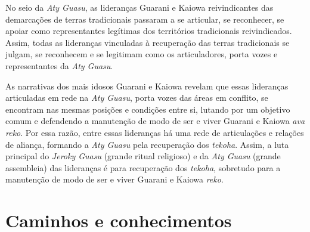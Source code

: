 No seio da \emph{Aty Guasu}, as lideranças Guarani e Kaiowa reivindicantes das
demarcações de terras tradicionais passaram a se articular, se
reconhecer, se apoiar como representantes legítimas dos territórios
tradicionais reivindicados. Assim, todas as lideranças vinculadas à
recuperação das terras tradicionais se julgam, se reconhecem e se
legitimam como os articuladores, porta vozes e representantes da \emph{Aty
Guasu}. 

As narrativas dos mais idosos Guarani e Kaiowa revelam que essas
lideranças articuladas em rede na \emph{Aty Guasu}, porta vozes das áreas em
conflito, se encontram nas mesmas posições e condições entre si,
lutando por um objetivo comum e defendendo a manutenção de modo de ser
e viver Guarani e Kaiowa \emph{ava reko}. Por essa razão, entre essas
lideranças há uma rede de articulações e relações de aliança, formando
a \emph{Aty Guasu} pela recuperação dos \emph{tekoha}. Assim, a luta principal do
\emph{Jeroky Guasu} (grande ritual religioso) e da \emph{Aty Guasu} (grande
assembleia) das lideranças é para recuperação dos \emph{tekoha}, sobretudo
para a manutenção de modo de ser e viver Guarani e Kaiowa \emph{reko}.

\part{Caminhos e conhecimentos}


